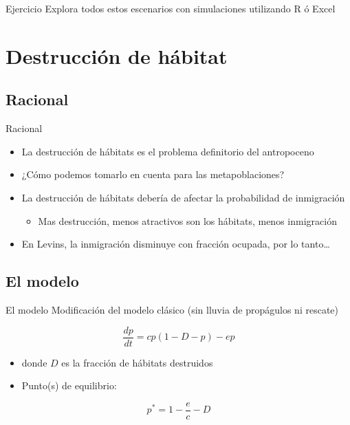 \documentclass[
  11pt,
  ignorenonframetext,
]{beamer}
\providecommand{\tightlist}{%
  \setlength{\itemsep}{0pt}\setlength{\parskip}{0pt}}
\begin{document}
\begin{frame}{Ejercicio}
Explora todos estos escenarios con simulaciones utilizando R ó Excel
\end{frame}

\hypertarget{destrucciuxf3n-de-huxe1bitat}{%
\section{Destrucción de hábitat}\label{destrucciuxf3n-de-huxe1bitat}}

\hypertarget{racional-1}{%
\subsection{Racional}\label{racional-1}}

\begin{frame}{Racional}
\begin{itemize}
\item
  La destrucción de hábitats es el problema definitorio del antropoceno
\item
  ¿Cómo podemos tomarlo en cuenta para las metapoblaciones?
\item
  La destrucción de hábitats debería de afectar la probabilidad de
  inmigración

  \begin{itemize}
  \tightlist
  \item
    Mas destrucción, menos atractivos son los hábitats, menos
    inmigración
  \end{itemize}
\item
  En Levins, la inmigración disminuye con fracción ocupada, por lo
  tanto\ldots{}
\end{itemize}
\end{frame}

\hypertarget{el-modelo}{%
\subsection{El modelo}\label{el-modelo}}

\begin{frame}{El modelo}
Modificación del modelo clásico (sin lluvia de propágulos ni rescate)

\[\frac{dp}{dt} = cp(1-D-p) - ep\]

\begin{itemize}
\item
  donde \(D\) es la fracción de hábitats destruidos
\item
  Punto(s) de equilibrio:
\end{itemize}

\[p^* = 1 - \frac{e}{c} - D\]
\end{frame}
\end{document}
